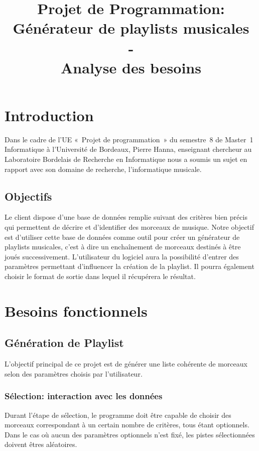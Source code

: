 \documentclass[11pt,a4paper]{article}
\title{
\vspace{\fill}
\Huge{
Projet de Programmation:\\Générateur de playlists musicales
\\-\\
Analyse des besoins
}
\vspace{\fill}
}
\author{}
\date{}
\begin{document}
\maketitle
\newpage

\tableofcontents
\newpage

\section*{Introduction}

Dans le cadre de l’UE «~Projet de programmation~» du semestre~8 de Master~1
Informatique à l’Université de Bordeaux, Pierre Hanna, enseignant chercheur au
Laboratoire Bordelais de Recherche en Informatique nous a soumis un sujet en
rapport avec son domaine de recherche, l’informatique musicale.

\subsection*{Objectifs}

Le client dispose d’une base de données remplie suivant des critères bien précis
qui permettent de décrire et d'identifier des morceaux de musique. Notre objectif
est d’utiliser cette base de données comme outil pour créer un générateur de
playlists musicales, c’est à dire un enchaînement de morceaux destinés à être
joués successivement. L’utilisateur du logiciel aura la possibilité d’entrer des
paramètres permettant d’influencer la création de la playlist. Il pourra
également choisir le format de sortie dans lequel il récupérera le résultat.

\newpage
\section{Besoins fonctionnels}
\label{sec:fonc}

\subsection{Génération de Playlist}

L’objectif principal de ce projet est de générer une liste cohérente de morceaux
selon des paramètres choisis par l’utilisateur.

\subsubsection{Sélection: interaction avec les données}

Durant l’étape de sélection, le programme doit être capable de choisir des
morceaux correspondant à un certain nombre de critères, tous étant optionnels.
Dans le cas où aucun des paramètres optionnels n’est fixé, les pistes
sélectionnées doivent êtres aléatoires.
\end{document}
